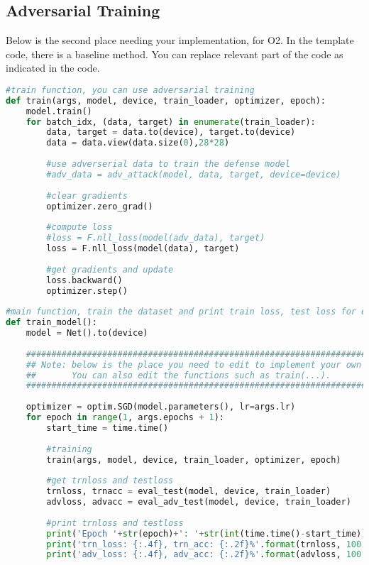 \subsection*{Adversarial Training}

Below is the second place needing your implementation, for O2. In the template code, there is a baseline method. You can replace relevant part of the code as indicated in the code. 

\begin{lstlisting}[language=Python]
#train function, you can use adversarial training
def train(args, model, device, train_loader, optimizer, epoch):
    model.train()
    for batch_idx, (data, target) in enumerate(train_loader):
        data, target = data.to(device), target.to(device)
        data = data.view(data.size(0),28*28)
        
        #use adverserial data to train the defense model
        #adv_data = adv_attack(model, data, target, device=device)
        
        #clear gradients
        optimizer.zero_grad()
        
        #compute loss
        #loss = F.nll_loss(model(adv_data), target)
        loss = F.nll_loss(model(data), target)
        
        #get gradients and update
        loss.backward()
        optimizer.step()
        
#main function, train the dataset and print train loss, test loss for each epoch
def train_model():
    model = Net().to(device)
    
    #####################################################################
    ## Note: below is the place you need to edit to implement your own training algorithm
    ##       You can also edit the functions such as train(...). 
    #####################################################################
    
    optimizer = optim.SGD(model.parameters(), lr=args.lr)
    for epoch in range(1, args.epochs + 1):
        start_time = time.time()
        
        #training
        train(args, model, device, train_loader, optimizer, epoch)
        
        #get trnloss and testloss
        trnloss, trnacc = eval_test(model, device, train_loader)
        advloss, advacc = eval_adv_test(model, device, train_loader)
        
        #print trnloss and testloss
        print('Epoch '+str(epoch)+': '+str(int(time.time()-start_time))+'s', end=', ')
        print('trn_loss: {:.4f}, trn_acc: {:.2f}%'.format(trnloss, 100. * trnacc), end=', ')
        print('adv_loss: {:.4f}, adv_acc: {:.2f}%'.format(advloss, 100. * advacc))
        

\end{lstlisting}
